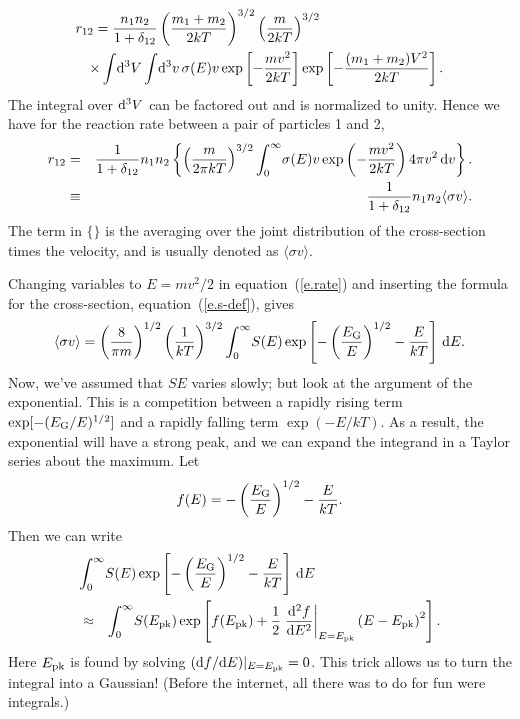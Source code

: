 \begin{eqnarray*}
\lefteqn{r_{12} = \frac{n_{1}n_{2}}{1+\delta_{12}} \left(\frac{m_{1}+m_{2}}{2kT}\right)^{3/2}\left(\frac{m}{2kT}\right)^{3/2}}\\
&&\times \int\!\dif^{3}V \int\!\dif^{3}v \,\sigma(E)v \exp\left[-\frac{mv^{2}}{2kT}\right]
 \exp\left[-\frac{(m_{1}+m_{2})V^{2}}{2kT}\right].
\end{eqnarray*}
The integral over $\mathrm{d}^{3}V$ can be factored out and is normalized to unity. Hence we have for the reaction rate between a pair of particles 1 and 2, 
\begin{eqnarray}\label{e.rate}
r_{12} &=& \frac{1}{1+\delta_{12}}n_{1}n_{2}\left\{\left(\frac{m}{2\pi kT}\right)^{3/2}\int_{0}^{\infty}\! \sigma(E) v \exp\left(-\frac{mv^{2}}{2kT}\right)  4\pi v^{2}\,\mathrm{d} v\right\}.\nonumber\\
 &\equiv& \frac{1}{1+\delta_{12}}n_{1}n_{2}\langle\sigma v\rangle.
\end{eqnarray}
The term in $\{\}$ is the averaging over the joint distribution of the cross-section times the velocity, and is usually denoted as $\langle\sigma v\rangle$. 

Changing variables to $E = mv^{2}/2$ in equation~(\ref{e.rate}) and inserting the formula for the cross-section, equation~(\ref{e.s-def}), gives
\begin{equation}\label{e.integral}
\langle\sigma v\rangle = \left(\frac{8}{\pi m}\right)^{1/2}\left(\frac{1}{kT}\right)^{3/2}\int_{0}^{\infty}\!S(E)\exp\left[-\left(\frac{E_{\mathrm{G}}}{E}\right)^{1/2}-\frac{E}{kT}\right]\,\mathrm{d} E.
\end{equation}
Now, we've assumed that $S{E}$ varies slowly; but look at the argument of the exponential. This is a competition between a rapidly rising term $\exp[-(E_{\mathrm{G}}/E)^{1/2}]$ and a rapidly falling term $\exp(-E/kT)$. As a result, the exponential will have a strong peak, and we can expand the integrand in a Taylor series about the maximum. Let 
\[
f(E) = -\left(\frac{E_{\mathrm{G}}}{E}\right)^{1/2} - \frac{E}{kT}.
\]
Then we can write 
\begin{eqnarray*}
\lefteqn{\int_{0}^{\infty}\!S(E)\exp\left[-\left(\frac{\EG}{E}\right)^{1/2}-\frac{E}{kT}\right]\,\dif E}\\
&\approx&
	\int_{0}^{\infty}\! S(\Epk)\exp\left[f(\Epk) + \frac{1}{2}\left.\frac{\dif^{2} f}{\dif E^{2}}\right|_{E=\Epk}\left(E-\Epk\right)^{2}\right].
\end{eqnarray*}
Here $E_{\mathrm{pk}}$ is found by solving $(\mathrm{d} f/\mathrm{d} E)|_{E=E_{\mathrm{pk}}} = 0$. This trick allows us to turn the integral into a Gaussian! (Before the internet, all there was to do for fun were integrals.)

